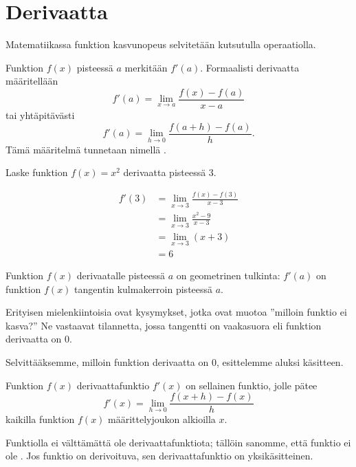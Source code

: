 \chapter{Derivaatta}


Matematiikassa funktion kasvunopeus selvitetään  kutsutulla operaatiolla.

Funktion $f(x)$  pisteessä $a$ merkitään $f'(a)$.
Formaalisti derivaatta määritellään
\[ f'(a) = \lim\limits_{x \to a} \frac{f(x)-f(a)}{x-a} \]
tai yhtäpitävästi
\[ f'(a) = \lim\limits_{h \to 0} \frac{f(a+h)-f(a)}{h}. \]
Tämä määritelmä tunnetaan nimellä .

\begin{esimerkki}
	Laske funktion $f(x) = x^2$ derivaatta pisteessä $3$.
	\begin{esimratk}
		\begin{align*}
			f'(3) &= \lim\limits_{x \to 3} \frac{f(x)-f(3)}{x-3} \\
				  &= \lim\limits_{x \to 3} \frac{x^2-9}{x-3} \\
				  &= \lim\limits_{x \to 3} (x+3) \\
				  &= 6
		\end{align*}
	\end{esimratk}
\end{esimerkki}

Funktion $f(x)$ derivaatalle pisteessä $a$ on geometrinen tulkinta:
$f'(a)$ on funktion $f(x)$ tangentin kulmakerroin pisteessä $a$.

Erityisen mielenkiintoisia ovat kysymykset, jotka ovat muotoa
''milloin funktio ei kasva?'' Ne vastaavat tilannetta, jossa tangentti
on vaakasuora eli funktion derivaatta on $0$.

Selvittääksemme, milloin funktion derivaatta on $0$, esittelemme aluksi
 käsitteen.

Funktion $f(x)$ derivaattafunktio $f'(x)$ on sellainen funktio, jolle pätee
\[ f'(x) = \lim\limits_{h \to 0} \frac{f(x+h)-f(x)}{h} \]
kaikilla funktion $f(x)$ määrittelyjoukon alkioilla $x$.

Funktiolla ei välttämättä ole derivaattafunktiota; tällöin sanomme, että funktio
ei ole . Jos funktio on derivoituva, sen
derivaattafunktio on yksikäsitteinen.

